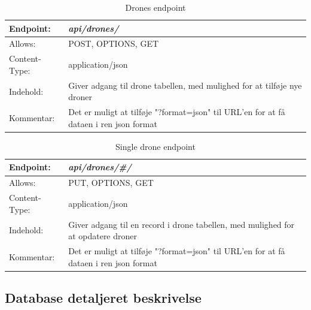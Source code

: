 \begin{table}[H]
\begin{tabular}{| p{3cm}| p{11.5cm}|}
\hline
Endpoint:	 							&\textbf{\textit{api/drones/}}\\\hline
Allows:									& POST, OPTIONS, GET\\\hline
Content-Type:						& application/json\\\hline 
Indehold:								& Giver adgang til drone tabellen, med mulighed for at tilføje nye droner\\\hline 
Kommentar:							& Det er muligt at tilføje "?format=json" til URL'en for at få dataen i ren json format\\\hline
\end{tabular}
\caption{Drones endpoint}
\label{drones_endpoint}
\end{table}

\begin{table}[H]
\begin{tabular}{| p{3cm}| p{11.5cm}|}
\hline
Endpoint:	 							&\textbf{\textit{api/drones/\#/}}\\\hline
Allows:									& PUT, OPTIONS, GET\\\hline
Content-Type:						& application/json\\\hline 
Indehold:								& Giver adgang til en record i drone tabellen, med mulighed for at opdatere droner\\\hline 
Kommentar:							& Det er muligt at tilføje "?format=json" til URL'en for at få dataen i ren json format\\\hline
\end{tabular}
\caption{Single drone endpoint}
\label{single_drone_endpoint}
\end{table}

\newpage
\subsection{Database detaljeret beskrivelse}


\newpage

\newpage

\newpage

\newpage


